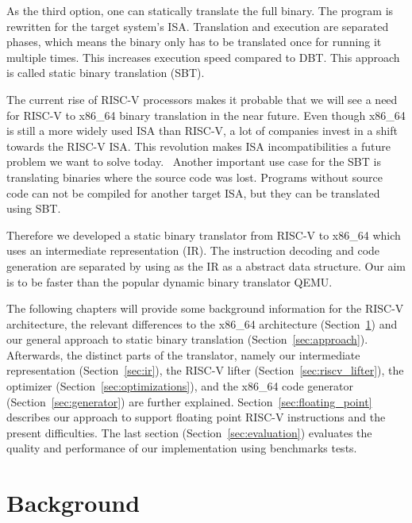 \documentclass[course=eragp]{aspdoc}
\begin{document}
As the third option, one can statically translate the full binary. The program is rewritten for the
target system's ISA.
Translation and execution are separated phases, which means the binary only has to be translated once for
running it multiple times. This increases execution speed compared to DBT. This
approach is called static binary translation (SBT).~\cite{binary_translation}

\par

The current rise of RISC-V processors makes it probable that we will see a need for RISC-V to
x86\_64 binary translation in the near future. Even though x86\_64 is still a more widely used ISA
than RISC-V, a lot of companies invest in a shift towards the RISC-V ISA. This revolution makes ISA
incompatibilities a future problem we want to solve today.~\cite{riscv_rises} Another important use
case for the SBT is translating binaries where the source code was lost. Programs without source
code can not be compiled for another target ISA, but they can be translated using SBT.

\par

Therefore we developed a static binary translator from RISC-V to x86\_64 which uses an intermediate
representation (IR). The instruction decoding and code generation are separated by using as the IR
as a abstract data structure. Our aim is to be faster than the popular dynamic binary translator
QEMU.

\par

The following chapters will provide some background information for the RISC-V architecture, the
relevant differences
to the x86\_64 architecture (Section~\ref{sec:background}) and our general
approach to static binary translation (Section~\ref{sec:approach}). Afterwards, the distinct parts of the translator, namely our
intermediate representation (Section~\ref{sec:ir}), the RISC-V lifter
(Section~\ref{sec:riscv_lifter}), the optimizer (Section~\ref{sec:optimizations}), and the x86\_64
code generator (Section~\ref{sec:generator}) are further explained.
Section~\ref{sec:floating_point} describes our approach to support floating point RISC-V
instructions and the present difficulties. The last section (Section~\ref{sec:evaluation})
evaluates the quality and performance of our implementation using benchmarks tests.

\section{Background}\label{sec:background}
\end{document}
